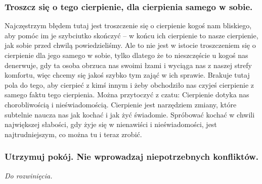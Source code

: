 \documentclass[../dotknieci-miloscia.tex]{subfiles}
\begin{document}
\subsubsection{Troszcz się o tego cierpienie, dla cierpienia samego w sobie.}
Najczęstrzym błędem tutaj jest troszczenie się o cierpienie kogoś nam bliskiego, 
aby pomóc im je szybciutko skończyć 
-- w końcu ich cierpienie to nasze cierpienie, 
jak sobie przed chwilą powiedzieliśmy. 
Ale to nie jest w istocie troszczeniem się o cierpienie dla jego samego w sobie, 
tylko dlatego że to nieszczęście u kogoś nas denerwuje, 
gdy ta osoba obrzuca nas swoimi łzami i wyciąga nas z naszej strefy komfortu, 
więc chcemy się jakoś szybko tym zająć w ich sprawie. 
Brakuje tutaj pola do tego, aby cierpieć z kimś innym 
i żeby obchodziło nas czyjeś cierpienie z samego faktu tego cierpienia. 
Można przytoczyć z czatu: Cierpienie dotyka nas chorobliwością i nieświadomością. 
Cierpienie jest narzędziem zmiany, które subtelnie naucza nas jak kochać i jak żyć świadomie. 
Spróbować kochać w chwili największej słabości, 
gdy żyje się w nienawiści i nieświadomości, 
jest najtrudniejszym, co można tu i teraz zrobić. 

\subsubsection{Utrzymuj pokój. Nie wprowadzaj niepotrzebnych konfliktów.}
\emph{Do rozwinięcia.}
\end{document}
